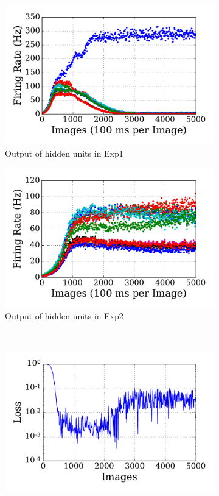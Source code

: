 \begin{figure}
\begin{subfigure}[t]{0.48\textwidth}
		\includegraphics[width=\textwidth]{pics_sdlm/10_exp_SRBM_Orig/exp1_hid_s.pdf}
		\caption{Output of hidden units in Exp1}
	\end{subfigure}
	\begin{subfigure}[t]{0.48\textwidth}
		\includegraphics[width=\textwidth]{pics_sdlm/10_exp_SRBM_Orig/exp2_hid_s.pdf}
		\caption{Output of hidden units in Exp2}
	\end{subfigure}\\
	\begin{subfigure}[t]{0.48\textwidth}
		\includegraphics[width=\textwidth]{pics_sdlm/10_exp_SRBM_Orig/exp1_mse_nons.pdf}

\end{subfigure}
\end{figure}
